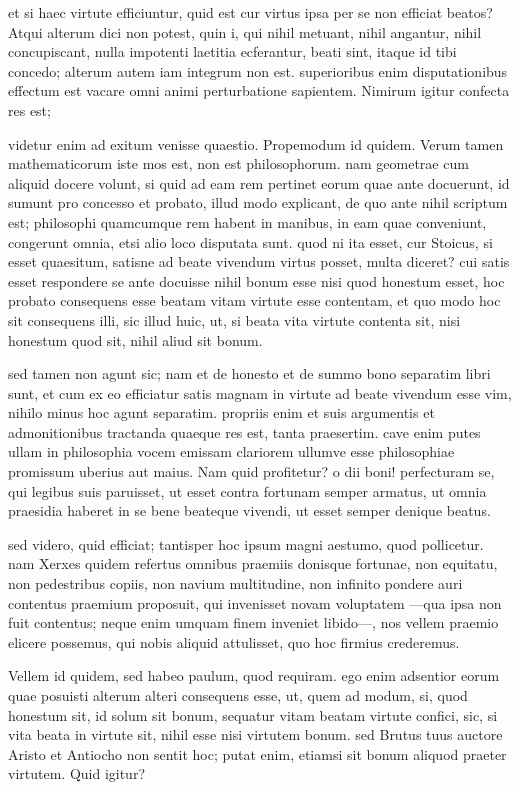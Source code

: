  et si haec virtute efficiuntur, quid est cur virtus ipsa per se non efficiat beatos? Atqui alterum dici non potest, quin i, qui nihil metuant, nihil angantur, nihil concupiscant, nulla impotenti laetitia ecferantur, beati sint, itaque id tibi concedo; alterum autem iam integrum non est. superioribus enim disputationibus effectum est vacare omni animi perturbatione sapientem. Nimirum igitur confecta res est;

 videtur enim ad exitum venisse quaestio. Propemodum id quidem. Verum tamen mathematicorum iste mos est, non est philosophorum. nam geometrae cum aliquid docere volunt, si quid ad eam rem pertinet eorum quae ante docuerunt, id sumunt pro concesso et probato, illud modo explicant, de quo ante nihil scriptum est; philosophi quamcumque rem habent in manibus, in eam quae conveniunt, congerunt omnia, etsi alio loco disputata sunt. quod ni ita esset, cur Stoicus, si esset quaesitum, satisne ad beate vivendum virtus posset, multa diceret? cui satis esset respondere se ante docuisse nihil bonum esse nisi quod honestum esset, hoc probato consequens esse beatam vitam virtute esse contentam, et quo modo hoc sit consequens illi, sic illud huic, ut, si beata vita virtute contenta sit, nisi honestum quod sit, nihil aliud sit bonum.

 sed tamen non agunt sic; nam et de honesto et de summo bono separatim libri sunt, et cum ex eo efficiatur satis magnam in virtute ad beate vivendum esse vim, nihilo minus hoc agunt separatim. propriis enim et suis argumentis et admonitionibus tractanda quaeque res est, tanta praesertim. cave enim putes ullam in philosophia vocem emissam clariorem ullumve esse philosophiae promissum uberius aut maius. Nam quid profitetur? o dii boni! perfecturam se, qui legibus suis paruisset, ut esset contra fortunam semper armatus, ut omnia praesidia haberet in se bene beateque vivendi, ut esset semper denique beatus.

 sed videro, quid efficiat; tantisper hoc ipsum magni aestumo, quod pollicetur. nam Xerxes quidem refertus omnibus praemiis donisque fortunae, non equitatu, non pedestribus copiis, non navium multitudine, non infinito pondere auri contentus praemium proposuit, qui invenisset novam voluptatem —qua ipsa non fuit contentus; neque enim umquam finem inveniet libido—, nos vellem praemio elicere possemus, qui nobis aliquid attulisset, quo hoc firmius crederemus.

 Vellem id quidem, sed habeo paulum, quod requiram. ego enim adsentior eorum quae posuisti alterum alteri consequens esse, ut, quem ad modum, si, quod honestum sit, id solum sit bonum, sequatur vitam beatam virtute confici, sic, si vita beata in virtute sit, nihil esse nisi virtutem bonum. sed Brutus tuus auctore Aristo et Antiocho non sentit hoc; putat enim, etiamsi sit bonum aliquod praeter virtutem. Quid igitur?

